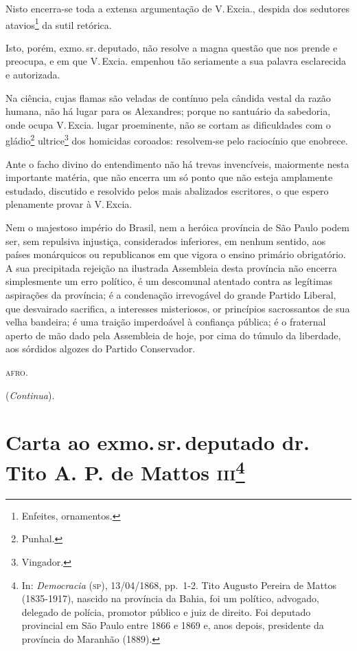 Nisto encerra-se toda a extensa argumentação de V.\,Excia., despida dos
sedutores atavios\footnote{Enfeites, ornamentos.} da sutil retórica.

Isto, porém, exmo.\,sr.\,deputado, não resolve a magna questão que nos
prende e preocupa, e em que V.\,Excia. empenhou tão seriamente a sua
palavra esclarecida e autorizada.

Na ciência, cujas flamas são veladas de contínuo pela cândida vestal da
razão humana, não há lugar para os Alexandres; porque no santuário da
sabedoria, onde ocupa V.\,Excia. lugar proeminente, não se cortam as
dificuldades com o gládio\footnote{Punhal.} ultrice\footnote{
  Vingador.} dos homicidas coroados: resolvem-se pelo raciocínio que
enobrece.

Ante o facho divino do entendimento não há trevas invencíveis,
maiormente nesta importante matéria, que não encerra um só ponto que não
esteja amplamente estudado, discutido e resolvido pelos mais abalizados
escritores, o que espero plenamente provar à V.\,Excia.

Nem o majestoso império do Brasil, nem a heróica província de São Paulo
podem ser, sem repulsiva injustiça, considerados inferiores, em nenhum
sentido, aos países monárquicos ou republicanos em que vigora o ensino
primário obrigatório. A sua precipitada rejeição na ilustrada Assembleia
desta província não encerra simplesmente um erro político, é um
descomunal atentado contra as legítimas aspirações da província; é a
condenação irrevogável do grande Partido Liberal, que desvairado
sacrifica, a interesses misteriosos, or princípios sacrossantos de sua
velha bandeira; é uma traição imperdoável à confiança pública; é o
fraternal aperto de mão dado pela Assembleia de hoje, por cima do túmulo
da liberdade, aos sórdidos algozes do Partido Conservador.
\begin{flushright}
\textsc{afro}.
\end{flushright}
(\emph{Continua}).

\chapter{Carta ao exmo.\,sr.\,deputado dr.\,Tito A. P. de Mattos
\textsc{iii}\footnote{In: \emph{Democracia} (\textsc{sp}), 13/04/1868, pp.~1-2.
  Tito Augusto Pereira de Mattos (1835-1917), nascido na província da
  Bahia, foi um político, advogado, delegado de polícia, promotor
  público e juiz de direito. Foi deputado provincial em São Paulo entre
  1866 e 1869 e, anos depois, presidente da província do Maranhão
  (1889).}}

